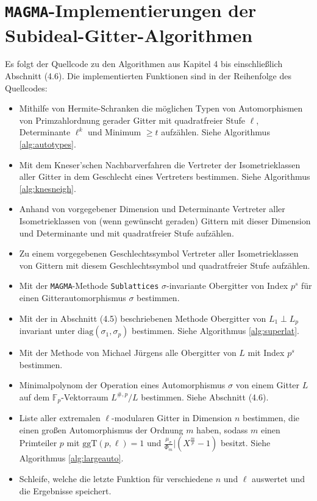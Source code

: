 \documentclass[12pt,a4paper,halfparskip,headsepline,bibtotocnumbered]{scrreprt}
\theoremstyle{nummermitklammern}
\theoremstyle{nonumberbreak}
\newcommand{\F}{\mathbb{F}}
\newcommand{\ggT}{\text{ggT}}
\begin{document}
\section{\texttt{MAGMA}-Implementierungen der Subideal-Gitter-Algorithmen}
Es folgt der Quellcode zu den Algorithmen aus Kapitel 4 bis einschließlich Abschnitt (4.6). Die implementierten Funktionen sind in der Reihenfolge des Quellcodes:
\begin{itemize}
	\item Mithilfe von Hermite-Schranken die möglichen Typen von Automorphismen von Primzahlordnung gerader Gitter mit quadratfreier Stufe $\ell$, Determinante $\ell^k$ und Minimum $\geq t$ aufzählen. Siehe Algorithmus \eqref{alg:autotypes}.
	\item Mit dem Kneser'schen Nachbarverfahren die Vertreter der Isometrieklassen aller Gitter in dem Geschlecht eines Vertreters bestimmen. Siehe Algorithmus \eqref{alg:knesneigh}.
	\item Anhand von vorgegebener Dimension und Determinante Vertreter aller Isometrieklassen von (wenn gewünscht geraden) Gittern mit dieser Dimension und Determinante und mit quadratfreier Stufe aufzählen.
	\item Zu einem vorgegebenen Geschlechtssymbol Vertreter aller Isometrieklassen von Gittern mit diesem Geschlechtssymbol und quadratfreier Stufe aufzählen.
	\item Mit der \texttt{MAGMA}-Methode \texttt{Sublattices} $\sigma$-invariante Obergitter von Index $p^s$ für einen Gitterautomorphismus $\sigma$ bestimmen.
	\item Mit der in Abschnitt (4.5) beschriebenen Methode Obergitter von $L_1 \perp L_p$ invariant unter $\text{diag}(\sigma_1, \sigma_p)$ bestimmen. Siehe Algorithmus \eqref{alg:superlat}.
	\item Mit der Methode von Michael Jürgens alle Obergitter von $L$ mit Index $p^s$ bestimmen.
	\item Minimalpolynom der Operation eines Automorphismus $\sigma$ von einem Gitter $L$ auf dem $\F_p$-Vektorraum $L^{\#,p} / L$ bestimmen. Siehe Abschnitt (4.6).
	\item Liste aller extremalen $\ell$-modularen Gitter in Dimension $n$ bestimmen, die einen großen Automorphismus der Ordnung $m$ haben, sodass $m$ einen Primteiler $p$ mit $\ggT(p, \ell) = 1$ und $\frac{\mu_\sigma}{\Phi_m} \vert (X^\frac{m}{p} - 1)$ besitzt. Siehe Algorithmus \eqref{alg:largeauto}.
	\item Schleife, welche die letzte Funktion für verschiedene $n$ und $\ell$ auswertet und die Ergebnisse speichert.
\end{itemize}

\end{document}
